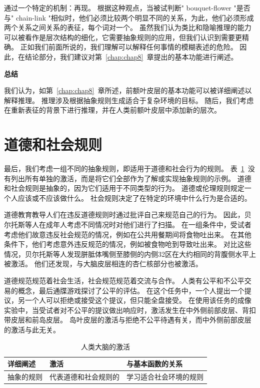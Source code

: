 通过一个特定的机制：再现。
根据这种观点，当被试判断" bouquet-flower "是否与" chain-link "相似时，他们必须比较两个明显不同的关系，为此，他们必须形成两个关系之间关系的表征，每个词对一个。
虽然我们认为类比和隐喻推理的能力可以被看作是层次结构的细化，它需要抽象规则的应用，但我们认识到需要更精确。
正如我们前面所说的，我们理解可以解释任何事情的模糊表述的危险。
因此，在结论部分，我们建议对第~\ref{chap:chap8}~章提出的基本功能进行阐述。



\textbf{总结}

我们认为，如第~\ref{chap:chap8}~章所述，前额叶皮层的基本功能可以被详细阐述以解释推理。
推理涉及根据抽象规则生成适合于复杂环境的目标。
随后，我们考虑在重新表征的背景下进行推理，并在人类前额叶皮层中添加新的层次。



\section{道德和社会规则}

最后，我们考虑一组不同的抽象规则，即适用于道德和社会行为的规则。
表~\ref{tab:9_9}~没有列出所有单独的激活，而是将它们全部作为了解或实现抽象规则的示例。
道德和社会规则是抽象的，因为它们适用于不同类型的行为。
道德或伦理规则规定一个人应该或不应该做什么。
社会规则决定了在特定的环境中什么行为是合适的。


道德教育教导人们在违反道德规则时通过批评自己来规范自己的行为\cite{locke1997self}。
因此，贝尔托斯等人\cite{berthoz2006affective}在成年人考虑不同情况时对他们进行了扫描。
在一组条件中，受试者考虑他们故意违反社会规范的情况，例如在公共用餐期间将食物吐出来。
在其他条件下，他们考虑意外违反规范的情况，例如被食物呛到导致吐出来。
对比这些情况，贝尔托斯等人发现胼胝体嘴侧至膝侧的内侧32区在大约相同的背腹侧水平上被激活。
他们还发现，与大脑皮层相连的杏仁核部分也被激活\cite{beckmann2009connectivity}。


道德规范规范着社会生活，社会规范规范着交流与合作。
人类有公平和不公平交易的概念，最后通牒游戏探讨了公平的评估。
在这个任务中，一个人提出一个提议，另一个人可以拒绝或接受这个提议，但只能全盘接受。
在使用该任务的成像实验中，当受试者对不公平的提议做出响应时，激活发生在中外侧前部皮层、背扣带皮层和前岛皮层\cite{sanfey2003neural}。
岛叶皮层的激活与拒绝不公平待遇有关，而中外侧前部皮层的激活与此无关。


\begin{table}[htbp] 
	\newcommand{\tabincell}[2]{\begin{tabular}{@{}#1@{}}#2\end{tabular}} %
	\centering
	\caption{人类大脑的激活\label{tab:9_9}}
	\renewcommand\arraystretch{1.5}	%
	\begin{tabular}{lll}
		\toprule
		详细阐述 & 激活 & 与基本函数的关系\\
		\midrule
		抽象的规则 & 代表道德和社会规则的 & 学习适合社会环境的规则  \\
		
		\bottomrule
		
	\end{tabular}%
\end{table}%


